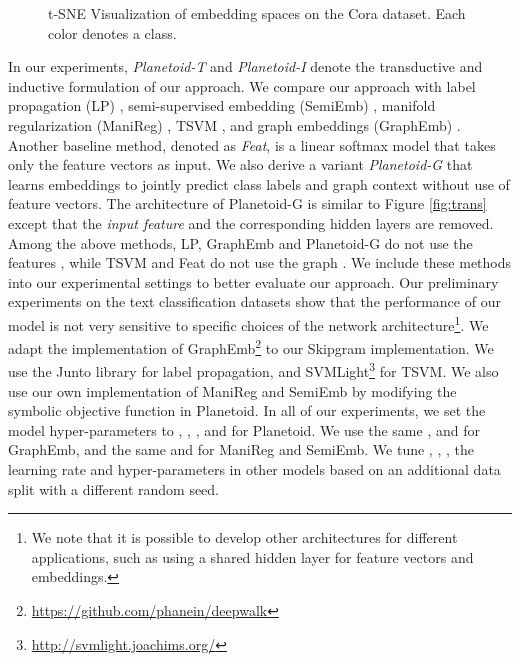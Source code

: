 \begin{figure*}[tb]
\vskip 0.2in
\centering
{}
\caption{t-SNE Visualization of embedding spaces on the Cora dataset. Each color denotes a class.}
\label{fig:vis}
\vskip -0.2in
\end{figure*}

In our experiments, \textit{Planetoid-T} and \textit{Planetoid-I} denote the transductive and inductive formulation of our approach.
We compare our approach with label propagation (LP) \cite{zhu2003semi}, semi-supervised embedding (SemiEmb) \cite{weston2012deep}, manifold regularization (ManiReg) \cite{belkin2006manifold}, TSVM \cite{joachims1999transductive}, and graph embeddings (GraphEmb) \cite{perozzi2014deepwalk}.
Another baseline method, denoted as \textit{Feat}, is a linear softmax model that takes only the feature vectors  as input. We also derive a variant \textit{Planetoid-G} that learns embeddings to jointly predict class labels and graph context without use of feature vectors. The architecture of Planetoid-G is similar to Figure \ref{fig:trans} except that the \textit{input feature} and the corresponding hidden layers are removed.
Among the above methods, LP, GraphEmb and Planetoid-G do not use the features , while TSVM and Feat do not use the graph . We include these methods into our experimental settings to better evaluate our approach.
Our preliminary experiments on the text classification datasets show that the performance of our model is not very sensitive to specific choices of the network architecture\footnote{We note that 
it is possible to develop other architectures for different 
applications, such as using a shared hidden layer for feature vectors and embeddings.}.
We adapt the implementation of GraphEmb\footnote{\url{https://github.com/phanein/deepwalk}} to our Skipgram implementation. We use the Junto library \cite{talukdar2009new} for label propagation, and SVMLight\footnote{\url{http://svmlight.joachims.org/}} for TSVM. We also use our own implementation of ManiReg and SemiEmb by modifying the symbolic objective function in Planetoid. In all of our experiments, we set the model hyper-parameters to , , ,  and  for Planetoid.
We use the same ,  and  for GraphEmb, and the same  and  for ManiReg and SemiEmb. We tune , , , the learning rate and hyper-parameters in other models based on an additional data split with a different random seed.



